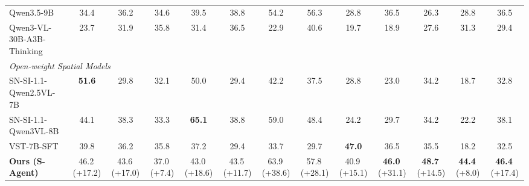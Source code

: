 \documentclass{llmxive}
\providecommand{\cone}[1]{\cellcolor{top1color}\textbf{#1}}
\providecommand{\ctwo}[1]{\cellcolor{top2color}#1}
\providecommand{\cthree}[1]{\cellcolor{top3color}#1}
\providecommand{\dpos}[1]{{\tiny\,(+#1)}}
\begin{document}
\begin{table}[t]
{\begin{tabular}{lcccccc|cc|cc|c|c}
        Qwen3.5-9B & 34.4 & 36.2 & 34.6 & 39.5 & 38.8 & 54.2 & 56.3 & 28.8 & 36.5 & 26.3 & 28.8 & 36.5 \\
        Qwen3-VL-30B-A3B-Thinking & 23.7 & 31.9 & 35.8 & 31.4 & 36.5 & 22.9 & 40.6 & 19.7 & 18.9 & 27.6 & 31.3 & 29.4 \\
        \midrule
        \multicolumn{13}{l}{\textit{Open-weight Spatial Models}} \\
        SN-SI-1.1-Qwen2.5VL-7B & \cone{51.6} & 29.8 & 32.1 & \cthree{50.0} & 29.4 & 42.2 & 37.5 & 28.8 & 23.0 & 34.2 & 18.7 & 32.8 \\
        SN-SI-1.1-Qwen3VL-8B & 44.1 & 38.3 & 33.3 & \cone{65.1} & 38.8 & 59.0 & 48.4 & 24.2 & 29.7 & 34.2 & 22.2 & 38.1 \\
        VST-7B-SFT & 39.8 & 36.2 & 35.8 & 37.2 & 29.4 & 33.7 & 29.7 & \cone{47.0} & 36.5 & 35.5 & 18.2 & 32.5 \\
        \midrule
        \textbf{Ours (S-Agent)} & \cthree{46.2}\dpos{17.2} & \ctwo{43.6}\dpos{17.0} & 37.0\dpos{7.4} & 43.0\dpos{18.6} & \ctwo{43.5}\dpos{11.7} & \ctwo{63.9}\dpos{38.6} & \cthree{57.8}\dpos{28.1} & \ctwo{40.9}\dpos{15.1} & \cone{46.0}\dpos{31.1} & \cone{48.7}\dpos{14.5} & \cone{44.4}\dpos{8.0} & \cone{46.4}\dpos{17.4} \\
        \bottomrule
    \end{tabular}%
    }
    \vspace{2mm}

\end{table}
\end{document}
